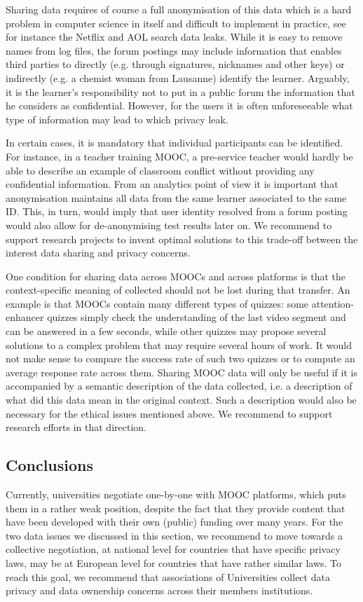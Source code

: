 Sharing data requires of course a full anonymisation of this data which
is a hard problem in computer science in itself and difficult to
implement in practice, see for instance the Netflix and AOL search data
leaks. While it is easy to remove names from log files, the forum
postings may include information that enables third parties to directly
(e.g. through signatures, nicknames and other keys) or indirectly
(e.g. a chemist woman from Lausanne) identify the learner. Arguably, it
is the learner's responsibility not to put in a public forum the
information that he considers as confidential. However, for the users it
is often unforeseeable what type of information may lead to which
privacy leak.

In certain cases, it is mandatory that individual participants can be
identified. For instance, in a teacher training MOOC, a pre-service
teacher would hardly be able to describe an example of classroom
conflict without providing any confidential information. From an
analytics point of view it is important that anonymisation maintains all
data from the same learner associated to the same ID. This, in turn,
would imply that user identity resolved from a forum posting would also
allow for de-anonymising test results later on. We recommend to support
research projects to invent optimal solutions to this trade-off between
the interest data sharing and privacy concerns.

One condition for sharing data across MOOCs and across platforms is that
the context-specific meaning of collected should not be lost during that
transfer. An example is that MOOCs contain many different types of
quizzes: some attention-enhancer quizzes simply check the understanding
of the last video segment and can be answered in a few seconds, while
other quizzes may propose several solutions to a complex problem that
may require several hours of work. It would not make sense to compare
the success rate of such two quizzes or to compute an average response
rate across them. Sharing MOOC data will only be useful if it is
accompanied by a semantic description of the data collected, i.e. a
description of what did this data mean in the original context. Such a
description would also be necessary for the ethical issues mentioned
above. We recommend to support research efforts in that direction.


\subsection{Conclusions}

Currently, universities negotiate one-by-one with MOOC platforms, which
puts them in a rather weak position, despite the fact that they provide
content that have been developed with their own (public) funding over
many years.  For the two data issues we discussed in this section, we
recommend to move towards a collective negotiation, at national level
for countries that have specific privacy laws, may be at European level
for countries that have rather similar laws. To reach this goal, we
recommend that associations of Universities collect data privacy and
data ownership concerns across their members institutions.

